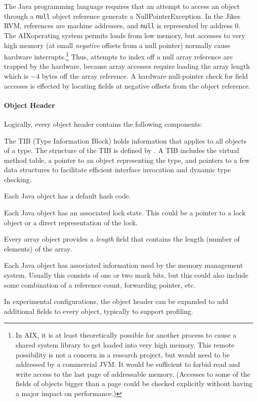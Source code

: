The Java programming language requires that an attempt to access an
object through a {\tt null} 
object reference generate a NullPointerException.  In the Jikes RVM, references
are machine addresses, and {\tt null} is represented by address $0$.
The AIX\AIXTMFootnote operating system permits loads from low memory,
but accesses 
to very high memory (at small {\em negative} offsets from a null
pointer) normally cause hardware interrupts.\footnote{In AIX, it is at
least theoretically possible for another process to cause a shared
system library to get loaded into very high memory.  This remote
possibility is not a concern in a research project, but would need to
be addressed by a commercial JVM.  It would be sufficient to forbid
read and write access to the last page of addressable memory.
(Accesses to some of the fields of objects bigger than a page could be
checked explicitly without having a major impact on performance.)}
Thus, attempts to index off a null array reference are trapped by
the hardware, because array accesses require loading the array length
which is $-4$ bytes off the array reference.  A hardware null-pointer
check for field accesses is effected by locating fields at negative
offsets from the object reference.

\paragraph{Object Header}
Logically, every object header contains the following components:
\begin{description}
%
\item [TIB Pointer] The TIB (Type Information Block) holds information that
applies to all objects of a type.  The structure of the TIB is defined by 
.
A TIB includes the virtual method table, a pointer to an object
representing the type, and pointers to a few data structures to
facilitate efficient interface invocation and dynamic type checking.
%
\item[Default Hash Code] Each Java object has a default hash code.
%
\item[Lock] Each Java object has an associated lock state.  This could be a
pointer to a lock object or a direct representation of the lock.
%
\item[Array Length] Every array object provides a {\em length} field
that contains the length (number of elements) of the array.
%
\item[Garbage Collection Information] Each Java object has associated
information used by the memory management system.  Usually this consists of one
or two mark bits, but this could also include some combination of a reference
count, forwarding pointer, etc.
%
\item[Misc Fields] In experimental configurations, the object header
can be expanded to add additional fields to every object, typically to
support profiling. 
\end{description}

